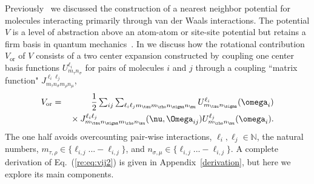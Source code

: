 \documentclass[preprint]{iucr}              %
\newcommand{\mb}[1]{\ensuremath{\mbox{\boldmath $ #1 $}}}
\begin{document}
Previously~\cite{Mettes04} we discussed the construction of a
nearest neighbor potential for molecules interacting primarily
through van der Waals interactions.
The potential $V$ is a level of abstraction above an atom-atom or site-site
potential but retains a firm basis in quantum
mechanics~\cite{Avoird94}. In \cite{Mettes04} we discuss how the rotational
contribution $V_{\mathrm{or}}$ of $V$ consists of a two center expansion
constructed by coupling one center basis functions $U^{\ell_i}_{m_\tau n_\sigma}$ for pairs of molecules $i$ and $j$ through a coupling ``matrix function" 
$J_{m_\tau n_\sigma m_\rho n_\mu}^{\ell_i\ell_j}$,
\begin{eqnarray}
\label{re:eq:vij2}V_{\mathrm{or}} &=&
\frac{1}{2}\sum_{ij}\sum_{\ell_i\ell_j m_\tau m_\rho n_\sigma n_\mu}
U^{\ell_i}_{m_\tau n_\sigma}(\mb{\omega}_i)\nonumber\\
&&{}\times J_{m_\tau n_\sigma m_\rho n_\mu}^{\ell_i
\ell_j}(\mb{\nu},\mb{\Omega}_{ij})U^{\ell_j}_{m_\rho
n_\mu}(\mb{\omega}_i).
\end{eqnarray}
The one half avoids overcounting pair-wise interactions,
$\ell_i,\ell_j\in\mathbb{N}$, the
natural numbers, $m_{\tau,\rho}\in\{\ell_{i,j}...-\ell_{i,j}\}$, and $
n_{\sigma,\mu}\in\{\ell_{i,j}...-\ell_{i,j}\}$. A complete derivation
of Eq.~(\ref{re:eq:vij2}) is given in Appendix~\ref{derivation}, but here we
explore its main components.
\end{document}
